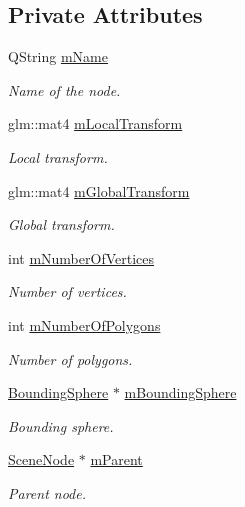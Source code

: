 \subsection*{Private Attributes}
\begin{DoxyCompactItemize}
\item 
Q\+String \hyperlink{class_scene_node_ad362c98f40bfd634a446a8074081ca00}{m\+Name}
\begin{DoxyCompactList}\small\item\em Name of the node. \end{DoxyCompactList}\item 
glm\+::mat4 \hyperlink{class_scene_node_a747578d1cb21d8ee37071cbf7d2f4218}{m\+Local\+Transform}
\begin{DoxyCompactList}\small\item\em Local transform. \end{DoxyCompactList}\item 
glm\+::mat4 \hyperlink{class_scene_node_a7d96b292c5b46cdc1ffeae67811ae652}{m\+Global\+Transform}
\begin{DoxyCompactList}\small\item\em Global transform. \end{DoxyCompactList}\item 
int \hyperlink{class_scene_node_a7c740b28389775b5df3a5a37af990c35}{m\+Number\+Of\+Vertices}
\begin{DoxyCompactList}\small\item\em Number of vertices. \end{DoxyCompactList}\item 
int \hyperlink{class_scene_node_a212fad91b1eeb3aad793101d81c1ba3e}{m\+Number\+Of\+Polygons}
\begin{DoxyCompactList}\small\item\em Number of polygons. \end{DoxyCompactList}\item 
\hyperlink{class_bounding_sphere}{Bounding\+Sphere} $\ast$ \hyperlink{class_scene_node_a64fcb90c98557ef563761dff3b8fd274}{m\+Bounding\+Sphere}
\begin{DoxyCompactList}\small\item\em Bounding sphere. \end{DoxyCompactList}\item 
\hyperlink{class_scene_node}{Scene\+Node} $\ast$ \hyperlink{class_scene_node_aa478ebb376c411801a004bcc2590046d}{m\+Parent}
\begin{DoxyCompactList}\small\item\em Parent node. \end{DoxyCompactList}\item 

\end{DoxyCompactItemize}

